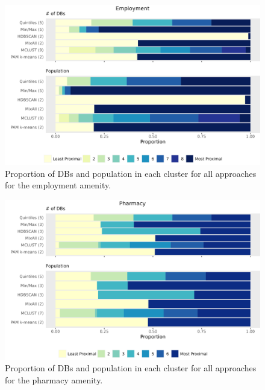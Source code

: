 \documentclass[11pt, a4paper]{article}
\begin{document}
\begin{figure}[H]
\centering
\includegraphics[width=\textwidth]{./barplot_comparison/Employment_barplot.png}
\caption[Employment profile barplot]{Proportion of DBs and population in each cluster for all approaches for the employment amenity.}\label{employmentbarplot}
\end{figure}








\begin{figure}[H]
\centering
\includegraphics[width=\textwidth]{./barplot_comparison/Pharmacy_barplot.png}
\caption[Pharmacy profile barplot]{Proportion of DBs and population in each cluster for all approaches for the pharmacy amenity.}\label{pharmacybarplot}
\end{figure}
\end{document}
